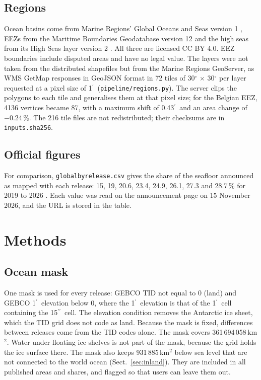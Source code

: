 \documentclass[essd, manuscript]{copernicus}
\newcommand{\as}{$^{\prime\prime}$}      %
\newcommand{\am}{$^{\prime}$}            %
\renewcommand{\_}{\usorig\allowbreak}
\begin{document}
\subsection{Regions}

Ocean basins come from Marine Regions' Global Oceans and Seas version 1 \citep{vliz2021goas}, EEZs from the Maritime Boundaries Geodatabase version 12 \citep{vliz2023eez} and the high seas from its High Seas layer version 2 \citep{vliz2024hs}.
All three are licensed CC BY 4.0.
EEZ boundaries include disputed areas and have no legal value.
The layers were not taken from the distributed shapefiles but from the Marine Regions GeoServer, as WMS GetMap responses in GeoJSON format in 72 tiles of 30$^\circ$ $\times$ 30$^\circ$ per layer requested at a pixel size of 1\am\ (\texttt{pipeline/regions.py}).
The server clips the polygons to each tile and generalises them at that pixel size; for the Belgian EEZ, 4136 vertices became 87, with a maximum shift of 0.43\am\ and an area change of $-0.24$\,\%.
The 216 tile files are not redistributed; their checksums are in \texttt{inputs.sha256}.

\subsection{Official figures}

For comparison, \texttt{global\_by\_release.csv} gives the share of the seafloor announced as mapped with each release: 15, 19, 20.6, 23.4, 24.9, 26.1, 27.3 and 28.7\,\% for 2019 to 2026 \citep{news2019,news2020,news2021,news2022,news2023,news2024,news2025,news2026}.
Each value was read on the announcement page on 15 November 2026, and the URL is stored in the table.

\section{Methods}
\label{sec:methods}

\subsection{Ocean mask}
\label{sec:mask}

One mask is used for every release: GEBCO\_2026 TID not equal to 0 (land) and GEBCO\_2026 1\am\ elevation below 0, where the 1\am\ elevation is that of the 1\am\ cell containing the 15\as\ cell.
The elevation condition removes the Antarctic ice sheet, which the TID grid does not code as land.
Because the mask is fixed, differences between releases come from the TID codes alone.
The mask covers 361\,694\,058\,km$^2$.
Water under floating ice shelves is not part of the mask, because the grid holds the ice surface there.
The mask also keeps 931\,885\,km$^2$ below sea level that are not connected to the world ocean (Sect.~\ref{sec:inland}).
They are included in all published areas and shares, and flagged so that users can leave them out.
\end{document}
